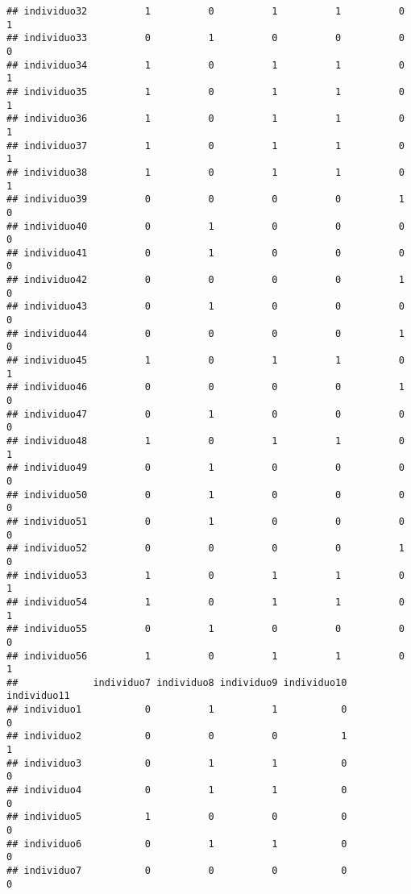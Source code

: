 \documentclass[
]{article}
\begin{document}
\begin{verbatim}
## individuo32          1          0          1          1          0          1
## individuo33          0          1          0          0          0          0
## individuo34          1          0          1          1          0          1
## individuo35          1          0          1          1          0          1
## individuo36          1          0          1          1          0          1
## individuo37          1          0          1          1          0          1
## individuo38          1          0          1          1          0          1
## individuo39          0          0          0          0          1          0
## individuo40          0          1          0          0          0          0
## individuo41          0          1          0          0          0          0
## individuo42          0          0          0          0          1          0
## individuo43          0          1          0          0          0          0
## individuo44          0          0          0          0          1          0
## individuo45          1          0          1          1          0          1
## individuo46          0          0          0          0          1          0
## individuo47          0          1          0          0          0          0
## individuo48          1          0          1          1          0          1
## individuo49          0          1          0          0          0          0
## individuo50          0          1          0          0          0          0
## individuo51          0          1          0          0          0          0
## individuo52          0          0          0          0          1          0
## individuo53          1          0          1          1          0          1
## individuo54          1          0          1          1          0          1
## individuo55          0          1          0          0          0          0
## individuo56          1          0          1          1          0          1
##             individuo7 individuo8 individuo9 individuo10 individuo11
## individuo1           0          1          1           0           0
## individuo2           0          0          0           1           1
## individuo3           0          1          1           0           0
## individuo4           0          1          1           0           0
## individuo5           1          0          0           0           0
## individuo6           0          1          1           0           0
## individuo7           0          0          0           0           0

\end{verbatim}
\end{document}

